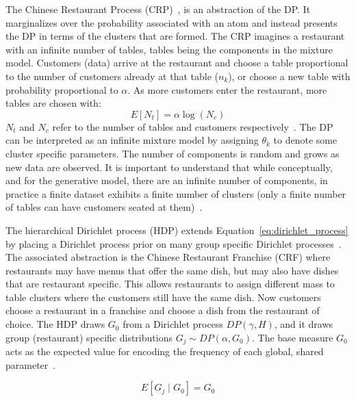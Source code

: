 The Chinese Restaurant Process (CRP)~\citep{neal2000markov, gershman2012tutorial}, is an abstraction of the DP. It marginalizes over the probability associated with an atom and instead presents the DP in terms of the clusters that are formed. The CRP imagines a restaurant with an infinite number of tables, tables being the components in the mixture model. Customers (data) arrive at the restaurant and choose a table proportional to the number of customers already at that table ($n_k$), or choose a new table with probability proportional to $\alpha$. As more customers enter the restaurant, more tables are chosen with:
\begin{equation}
  E[N_t] = \alpha \log(N_c)
\end{equation}
$N_t$ and $N_c$ refer to the number of tables and customers respectively~\citep{gershman2012tutorial}. The DP can be interpreted as an infinite mixture model by assigning $\theta_k$ to denote some cluster specific parameters. The number of components is random and grows as new data are observed. It is important to understand that while conceptually, and for the generative model, there are an infinite number of components, in practice a finite dataset exhibits a finite number of clusters (only a finite number of tables can have customers seated at them)~\citep{blei2006variational}.

The hierarchical Dirichlet process (HDP) extends Equation~\ref{eq:dirichlet_process} by placing a Dirichlet process prior on many group specific Dirichlet processes~\citep{teh2005sharing}. The associated abstraction is the Chinese Restaurant Franchise (CRF) where restaurants may have menus that offer the same dish, but may also have dishes that are restaurant specific. This allows restaurants to assign different mass to table clusters where the customers still have the same dish. Now customers choose a restaurant in a franchise and choose a dish from the restaurant of choice. The HDP draws $G_0$ from a Dirichlet process $DP(\gamma, H)$, and it draws group (restaurant) specific distributions $G_j \sim DP(\alpha, G_0)$. The base measure $G_0$ acts as the expected value for encoding the frequency of each global, shared parameter~\citep{fox2007hierarchical}.

\begin{equation}
  E[G_j \mid G_0] = G_0
\end{equation}

